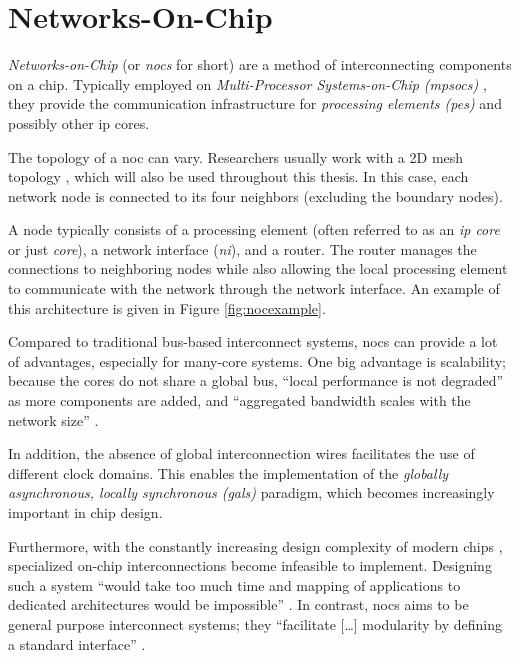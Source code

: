 \section{Networks-On-Chip}\label{sec:networkonchipfun}
\textit{Networks-on-Chip} (or \textit{\glspl{noc}} for short) are a method of interconnecting components on a chip. Typically employed on
\textit{Multi-Processor Systems-on-Chip (\glspl{mpsoc})} \cites(e.g.)(){ivanov05nocintroduction}{biswas15routerattack}{tatas16designingnocs}, they
provide the communication infrastructure for \textit{processing elements (\glspl{pe})} and possibly other \gls{ip} cores.

The topology of a \gls{noc} can vary. Researchers usually work with a 2D mesh topology
\cites(e.g.)(){frey17hardenednoc}{kumar02networkonchip}{fernandes16nocrouting}{boraten16packetsecurity}, which will also be used throughout this thesis.
In this case, each network node is connected to its four neighbors (excluding the boundary nodes).

A node typically consists of a processing element (often referred to as an \textit{\gls{ip} core} or just \textit{core}), a network interface
(\textit{\gls{ni}}), and a router. \cite{dally01routepacketsnotwires} The router manages the connections to neighboring nodes while also allowing
the local processing element to communicate with the network through the network interface. An example of this architecture is given in Figure
\vref{fig:nocexample}.

Compared to traditional bus-based interconnect systems, \glspl{noc} can provide a lot of advantages, especially for many-core systems.
\cite[5\psqq]{tatas16designingnocs} One big advantage is scalability; because the cores do not share a global bus, \enquote{local performance is not
degraded} \cite[6]{tatas16designingnocs} as more components are added, and \enquote{aggregated bandwidth scales with the network size}
\cite[6]{tatas16designingnocs}.

In addition, the absence of global interconnection wires facilitates the use of different clock domains. This enables the implementation of the
\textit{globally asynchronous, locally synchronous (\gls{gals})} paradigm, which becomes increasingly important in chip design.
\cites[3]{kumar02networkonchip}[2]{ivanov05nocintroduction}

Furthermore, with the constantly increasing design complexity of modern chips \cite{mack11mooreslaw}, specialized on-chip
interconnections become infeasible to implement. Designing such a system \enquote{would take too much time and mapping of applications to dedicated
architectures would be impossible} \cite[1]{kumar02networkonchip}. In contrast, \glspl{noc} aims to be general purpose interconnect systems; they
\enquote{facilitate […] modularity by defining a standard interface} \cite[1]{dally01routepacketsnotwires}.


